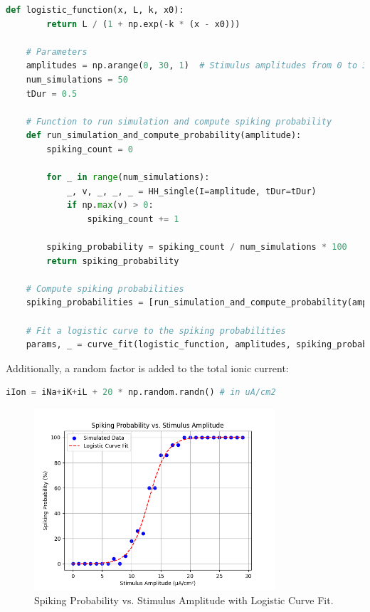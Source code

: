 \documentclass{article}
\begin{document}
    \begin{lstlisting}[language=Python, style=mystyle]
    def logistic_function(x, L, k, x0):
        return L / (1 + np.exp(-k * (x - x0)))

    # Parameters
    amplitudes = np.arange(0, 30, 1)  # Stimulus amplitudes from 0 to 30 μA/cm² in 1 μA/cm² steps
    num_simulations = 50
    tDur = 0.5

    # Function to run simulation and compute spiking probability
    def run_simulation_and_compute_probability(amplitude):
        spiking_count = 0

        for _ in range(num_simulations):
            _, v, _, _, _ = HH_single(I=amplitude, tDur=tDur)
            if np.max(v) > 0:
                spiking_count += 1

        spiking_probability = spiking_count / num_simulations * 100
        return spiking_probability

    # Compute spiking probabilities
    spiking_probabilities = [run_simulation_and_compute_probability(amplitude) for amplitude in amplitudes]

    # Fit a logistic curve to the spiking probabilities
    params, _ = curve_fit(logistic_function, amplitudes, spiking_probabilities, p0=[100, 1, 15])
    \end{lstlisting}

    Additionally, a random factor is added to the total ionic current:
    \begin{lstlisting}[language=Python, style=mystyle]
    iIon = iNa+iK+iL + 20 * np.random.randn() # in uA/cm2
    \end{lstlisting}

    \begin{figure}[h]
        \centering
        \includegraphics[width=0.8\textwidth]{spiking_probability.png}
        \caption{Spiking Probability vs. Stimulus Amplitude with Logistic Curve Fit.}
        \label{fig:spiking_probability_plot}
    \end{figure}
\end{document}
